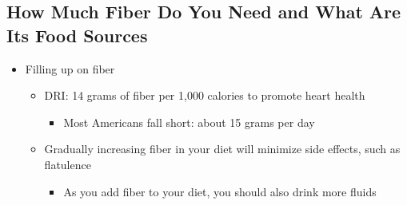 \documentclass[12pt]{article}
\begin{document}
        \subsection{How Much Fiber Do You Need and What Are Its Food Sources}
            \begin{itemize}
                \item Filling up on fiber
                    \begin{itemize}
                        \item DRI: 14 grams of fiber per 1,000 calories to promote heart health
                            \begin{itemize}
                                \item Most Americans fall short: about 15 grams per day
                            \end{itemize}
                        \item Gradually increasing fiber in your diet will minimize side effects, such as flatulence
                            \begin{itemize}
                                \item As you add fiber to your diet, you should also drink more fluids
                            \end{itemize}
                    \end{itemize}
            \end{itemize}
\end{document}
